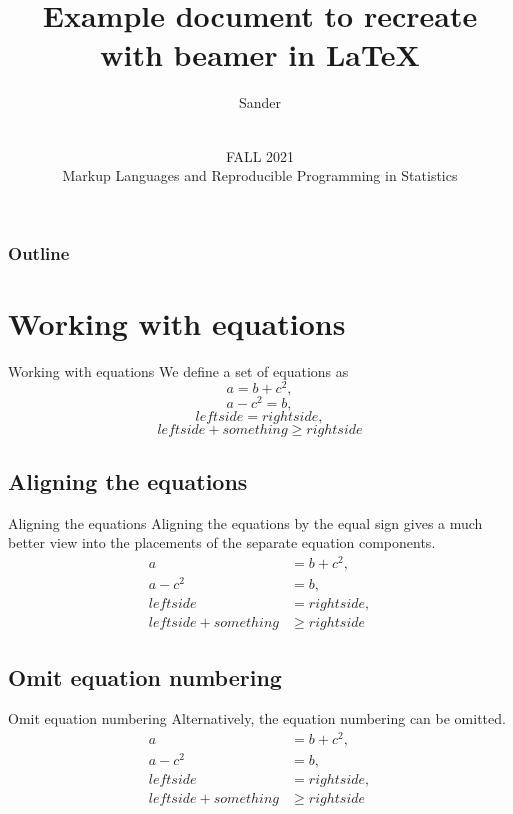 \documentclass{beamer}
\title[Example] {Example document to recreate with beamer in \LaTeX}
\author[Sander]{Sander}
\date{\\ FALL 2021 \\ Markup Languages and Reproducible Programming in Statistics}
\begin{document}
\begin{frame}
\titlepage
\end{frame}

\begin{frame}
\frametitle{Outline}
\tableofcontents
\end{frame}

\section{Working with equations}
\begin{frame}{Working with equations}
    We define a set of equations as
    \begin{equation}
    a = b + c^2,
    \end{equation}
    \begin{equation}
    a - c^2 = b,    
    \end{equation}
    \begin{equation}
    left side = right side,
    \end{equation}
    \begin{equation}
    left side + something \geq right side
    \end{equation}
\end{frame}

\subsection{Aligning the equations}
\begin{frame}{Aligning the equations}
Aligning the equations by the equal sign gives a much better view into the placements of the separate equation components.
\begin{align}
  a &= b + c^2, \\
            a - c^2 &= b, \\
            left side &= right side, \\
            left side + something &\geq right side
\end{align}
    
\end{frame}

\subsection{Omit equation numbering}
\begin{frame}{Omit equation numbering}
    Alternatively, the equation numbering can be omitted.
    \begin{align*}
  a &= b + c^2, \\
            a - c^2 &= b, \\
            left side &= right side, \\
            left side + something &\geq right side
\end{align*}
\end{frame}
\end{document}
